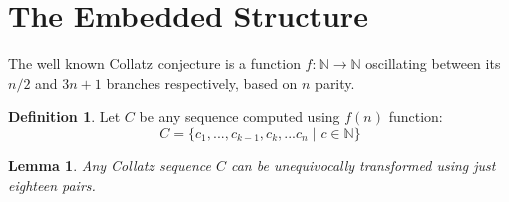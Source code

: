 \documentclass{jams-l}
\newtheorem{lemma}[theorem]{Lemma}
\theoremstyle{definition}
\newtheorem{definition}[theorem]{Definition}
\theoremstyle{remark}
\numberwithin{equation}{section}
\begin{document}
    \section{The Embedded Structure}
        The well known Collatz conjecture is a function $f: \mathbb{N} \longrightarrow \mathbb{N}$ oscillating between its $n/2$ and $3n+1$ branches respectively,  based on $n$ parity.
        \begin{definition}
            Let $C$ be any sequence computed using $f(n)$ function:
            \begin{equation}
                C = \{ c_1,..., c_{k-1}, c_{k},...c_n \; | \; c \in \mathbb{N}\}
            \end{equation}
        \end{definition}
        \begin{lemma}
            Any Collatz sequence $C$ can be unequivocally transformed using just eighteen pairs.
        \end{lemma}
\end{document}

